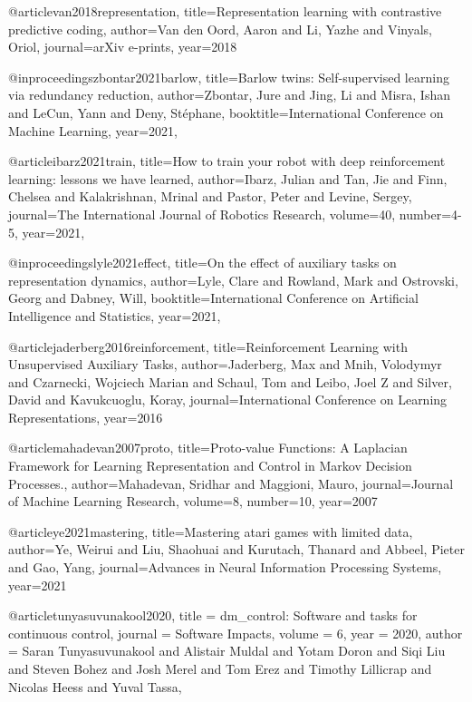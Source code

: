 @article{van2018representation,
  title={Representation learning with contrastive predictive coding},
  author={Van den Oord, Aaron and Li, Yazhe and Vinyals, Oriol},
  journal={arXiv e-prints},
  year={2018}
}

@inproceedings{zbontar2021barlow,
  title={Barlow twins: Self-supervised learning via redundancy reduction},
  author={Zbontar, Jure and Jing, Li and Misra, Ishan and LeCun, Yann and Deny, St{\'e}phane},
  booktitle={International Conference on Machine Learning},
  year={2021},
}

@article{ibarz2021train,
  title={How to train your robot with deep reinforcement learning: lessons we have learned},
  author={Ibarz, Julian and Tan, Jie and Finn, Chelsea and Kalakrishnan, Mrinal and Pastor, Peter and Levine, Sergey},
  journal={The International Journal of Robotics Research},
  volume={40},
  number={4-5},
  year={2021},
}

@inproceedings{lyle2021effect,
  title={On the effect of auxiliary tasks on representation dynamics},
  author={Lyle, Clare and Rowland, Mark and Ostrovski, Georg and Dabney, Will},
  booktitle={International Conference on Artificial Intelligence and Statistics},
  year={2021},
}

@article{jaderberg2016reinforcement,
  title={Reinforcement Learning with Unsupervised Auxiliary Tasks},
  author={Jaderberg, Max and Mnih, Volodymyr and Czarnecki, Wojciech Marian and Schaul, Tom and Leibo, Joel Z and Silver, David and Kavukcuoglu, Koray},
  journal={International Conference on Learning Representations},
  year={2016}
}

@article{mahadevan2007proto,
  title={Proto-value Functions: A Laplacian Framework for Learning Representation and Control in Markov Decision Processes.},
  author={Mahadevan, Sridhar and Maggioni, Mauro},
  journal={Journal of Machine Learning Research},
  volume={8},
  number={10},
  year={2007}
}

@article{ye2021mastering,
  title={Mastering atari games with limited data},
  author={Ye, Weirui and Liu, Shaohuai and Kurutach, Thanard and Abbeel, Pieter and Gao, Yang},
  journal={Advances in Neural Information Processing Systems},
  year={2021}
}

@article{tunyasuvunakool2020,
         title = {dm\_control: Software and tasks for continuous control},
         journal = {Software Impacts},
         volume = {6},
         year = {2020},
         author = {Saran Tunyasuvunakool and Alistair Muldal and Yotam Doron and
                   Siqi Liu and Steven Bohez and Josh Merel and Tom Erez and
                   Timothy Lillicrap and Nicolas Heess and Yuval Tassa},
}

